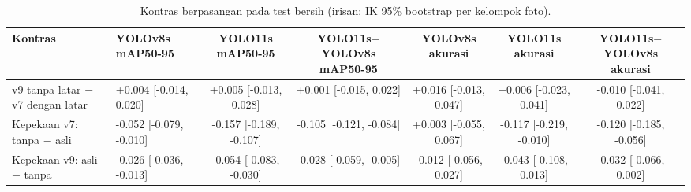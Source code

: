 \begin{table}[!t]
\centering
\caption{Kontras berpasangan pada test bersih (irisan; IK 95\% bootstrap per kelompok foto).}
\label{tab:v9_kontras}
\footnotesize
\setlength{\tabcolsep}{3pt}
\begin{tabular}{llccccc}
\hline
\textbf{Kontras} & \textbf{YOLOv8s mAP50-95} & \textbf{YOLO11s mAP50-95} & \textbf{YOLO11s$-$YOLOv8s mAP50-95} & \textbf{YOLOv8s akurasi} & \textbf{YOLO11s akurasi} & \textbf{YOLO11s$-$YOLOv8s akurasi} \\
\hline
v9 tanpa latar $-$ v7 dengan latar & +0.004 [-0.014, 0.020] & +0.005 [-0.013, 0.028] & +0.001 [-0.015, 0.022] & +0.016 [-0.013, 0.047] & +0.006 [-0.023, 0.041] & -0.010 [-0.041, 0.022] \\
Kepekaan v7: tanpa $-$ asli & -0.052 [-0.079, -0.010] & -0.157 [-0.189, -0.107] & -0.105 [-0.121, -0.084] & +0.003 [-0.055, 0.067] & -0.117 [-0.219, -0.010] & -0.120 [-0.185, -0.056] \\
Kepekaan v9: asli $-$ tanpa & -0.026 [-0.036, -0.013] & -0.054 [-0.083, -0.030] & -0.028 [-0.059, -0.005] & -0.012 [-0.056, 0.027] & -0.043 [-0.108, 0.013] & -0.032 [-0.066, 0.002] \\
\hline
\end{tabular}
\end{table}
